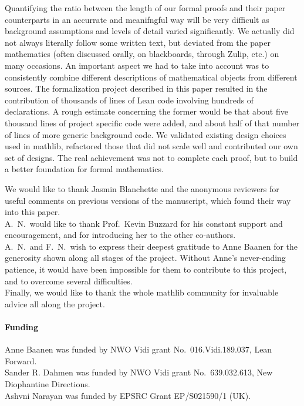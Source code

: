 \documentclass[sn-mathphys]{sn-jnl}%
\newcommand{\mathlib}{\textsf{mathlib}\xspace}
\begin{document}
Quantifying the ratio between the length of our formal proofs and their paper counterparts in an accurrate and meanifngful way will be very difficult as background assumptions and levels of detail varied significantly. We actually did not always literally follow some written text, but deviated from the paper mathematics (often discussed orally, on blackboards, through Zulip, etc.) on many occasions. An important aspect we had to take into account was to consistently combine different descriptions of mathematical objects from different sources.
The formalization project described in this paper resulted in the contribution of thousands of lines of Lean code involving hundreds of declarations.
A rough estimate concerning the former would be that about five thousand lines of project specific code were added, and about half of that number of lines of more generic background code.
We validated existing design choices used in \mathlib, refactored those that did not scale well
and contributed our own set of designs.
The real achievement was not to complete each proof,
but to build a better foundation for formal mathematics.

\backmatter

We would like to thank Jasmin Blanchette and the anonymous reviewers for useful comments on previous versions of the manuscript, which found their way into this paper.\\
A.~N.~would like to thank Prof.\ Kevin Buzzard for his constant support and encouragement, and for introducing her to the other co-authors.\\
A.~N.~and F.~N.~wish to express their deepest gratitude to Anne Baanen for the generosity shown along all stages of the project. Without Anne's never-ending patience, it would have been impossible for them to contribute to this project, and to overcome several difficulties.\\
Finally, we would like to thank the whole \mathlib community for invaluable advice all along the project.


\paragraph{Funding}
Anne Baanen was funded by NWO Vidi grant No.\ 016.Vidi.189.037, Lean Forward.\\
Sander R. Dahmen was funded by NWO Vidi grant No.\ 639.032.613, New Diophantine Directions.\\
Ashvni Narayan was funded by EPSRC Grant EP/S021590/1 (UK).
\end{document}
